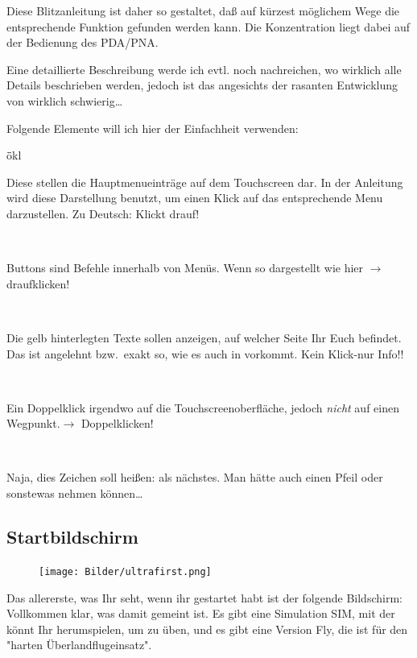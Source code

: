 Diese Blitzanleitung ist daher so gestaltet, daß auf kürzest möglichem Wege die entsprechende Funktion gefunden werden kann. Die Konzentration liegt dabei auf der Bedienung des \textsf{PDA/PNA}.

Eine detaillierte Beschreibung werde ich evtl. noch nachreichen, wo wirklich alle Details beschrieben werden, jedoch ist das angesichts der rasanten Entwicklung von \xc wirklich schwierig\dots

Folgende Elemente will ich hier der Einfachheit verwenden:

\begin{tabbing}
\quad\=ökl\hfill \kill
{} \> \parbox[c]{11,4cm}{Diese stellen die Hauptmenueinträge auf dem Touchscreen dar. In der Anleitung wird diese Darstellung benutzt, um einen Klick auf das
entsprechende Menu darzustellen. Zu Deutsch: Klickt drauf!}\\[1.2em]
           \>\parbox[c]{11,4cm}{Buttons sind Befehle innerhalb von Menüs.
Wenn so dargestellt wie  hier $\rightarrow$ draufklicken!}\\[1.2em]
  \>\parbox[c]{11,4cm}{Die gelb hinterlegten Texte sollen anzeigen, auf welcher Seite  Ihr Euch befindet. Das ist angelehnt bzw.\ exakt so, wie es auch in  \xc vorkommt. Kein Klick-nur Info!!}\\[1.2em]
\dklick                           \>\parbox[c]{11,4cm}{Ein Doppelklick irgendwo auf die Touchscreenoberfläche, jedoch \textsl{nicht} auf einen Wegpunkt.$\rightarrow$ Doppelklicken!}\\[1.2em]
\qquad\qquad \blink      \>\parbox[c]{11,4cm}{Naja, dies Zeichen soll heißen: als nächstes. Man hätte auch einen Pfeil oder sonstewas nehmen können\dots}
\end{tabbing}
\subsection{Startbildschirm}\label{startbildschirm}
\begin{figure}
\texttt{[image: Bilder/ultrafirst.png]}
\end{figure}
Das allererste, was Ihr seht, wenn ihr \xc gestartet habt ist der folgende Bildschirm:
Vollkommen klar, was damit gemeint ist. Es gibt eine Simulation \textsf{SIM}, mit der könnt Ihr herumspielen, um zu üben, und es gibt eine Version \textsf{Fly}, die ist für den "harten Überlandflugeinsatz".

